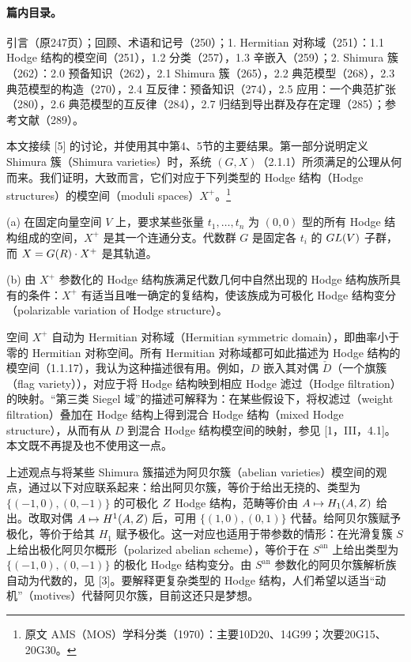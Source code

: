 \paragraph*{篇内目录。} 引言（原247页）；回顾、术语和记号（250）；1. Hermitian 对称域（251）：1.1 Hodge 结构的模空间（251），1.2 分类（257），1.3 辛嵌入（259）；2. Shimura 簇（262）：2.0 预备知识（262），2.1 Shimura 簇（265），2.2 典范模型（268），2.3 典范模型的构造（270），2.4 互反律：预备知识（274），2.5 应用：一个典范扩张（280），2.6 典范模型的互反律（284），2.7 归结到导出群及存在定理（285）；参考文献（289）。

本文接续 [5] 的讨论，并使用其中第4、5节的主要结果。第一部分说明定义 Shimura 簇（Shimura varieties）时，系统 $(G,X)$（2.1.1）所须满足的公理从何而来。我们证明，大致而言，它们对应于下列类型的 Hodge 结构（Hodge structures）的模空间（moduli spaces）$X^+$。\footnote{原文 AMS（MOS）学科分类（1970）：主要10D20、14G99；次要20G15、20G30。}

(a) 在固定向量空间 $V$ 上，要求某些张量 $t_1,\ldots,t_n$ 为 $(0,0)$ 型的所有 Hodge 结构组成的空间，$X^+$ 是其一个连通分支。代数群 $G$ 是固定各 $t_i$ 的 $GL(V)$ 子群，而 $X=G(R)\cdot X^+$ 是其轨道。

(b) 由 $X^+$ 参数化的 Hodge 结构族满足代数几何中自然出现的 Hodge 结构族所具有的条件：$X^+$ 有适当且唯一确定的复结构，使该族成为可极化 Hodge 结构变分（polarizable variation of Hodge structure）。

空间 $X^+$ 自动为 Hermitian 对称域（Hermitian symmetric domain），即曲率小于零的 Hermitian 对称空间。所有 Hermitian 对称域都可如此描述为 Hodge 结构的模空间（1.1.17），我认为这种描述很有用。例如，$D$ 嵌入其对偶 $\check D$（一个旗簇（flag variety）），对应于将 Hodge 结构映到相应 Hodge 滤过（Hodge filtration）的映射。“第三类 Siegel 域”的描述可解释为：在某些假设下，将权滤过（weight filtration）叠加在 Hodge 结构上得到混合 Hodge 结构（mixed Hodge structure），从而有从 $D$ 到混合 Hodge 结构模空间的映射，参见 [1，III，4.1]。本文既不再提及也不使用这一点。

上述观点与将某些 Shimura 簇描述为阿贝尔簇（abelian varieties）模空间的观点，通过以下对应联系起来：给出阿贝尔簇，等价于给出无挠的、类型为 $\{(-1,0),(0,-1)\}$ 的可极化 $Z$ Hodge 结构，范畴等价由 $A\mapsto H_1(A,Z)$ 给出。改取对偶 $A\mapsto H^1(A,Z)$ 后，可用 $\{(1,0),(0,1)\}$ 代替。给阿贝尔簇赋予极化，等价于给其 $H_1$ 赋予极化。这一对应也适用于带参数的情形：在光滑复簇 $S$ 上给出极化阿贝尔概形（polarized abelian scheme），等价于在 $S^{\mathrm{an}}$ 上给出类型为 $\{(-1,0),(0,-1)\}$ 的极化 Hodge 结构变分。由 $S^{\mathrm{an}}$ 参数化的阿贝尔簇解析族自动为代数的，见 [3]。要解释更复杂类型的 Hodge 结构，人们希望以适当“动机”（motives）代替阿贝尔簇，目前这还只是梦想。

